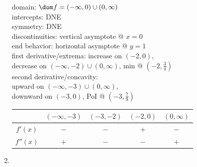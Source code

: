 \documentclass{book}
\begin{document}
\begin{appendices}
\begin{enumerate}[!HW!]
\begin{multicols}{2}
domain: $\dom f = (-\infty,0)\cup(0,\infty)$\\
intercepts: DNE\\
symmetry:  DNE \\ 
discontinuities: vertical asymptote @ $x=0$\\
end behavior: horizontal asymptote @ $y=1$\\ 
first derivative/extrema: increase on $(-2,0)$,\\ decrease on $(-\infty,-2)\cup (0,\infty)$, min @ $\left(-2,\frac{3}{4}\right)$ \\
second derivative/concavity:\\ upward on $(-\infty,-3)\cup(0,\infty)$,\\ downward on $(-3, 0)$, PoI @ $\left(-3,\frac{7}{9}\right)$ \vspace{-15pt}
\begin{center}
\begin{tabular}{c|c|c|c|c}
 & $(-\infty, -3)$ & $(-3, -2)$ & $(-2, 0)$ & $(0,\infty)$ \\ \hline
$f'(x)$ & $-$ & $-$ & $+$ & $-$ \\ 
$f''(x)$ & $+$ & $-$ & $-$ & $+$\\ 
\end{tabular}
\end{center} 
\end{multicols}

\item \mbox{}\vspace{-25pt}

\begin{multicols}{2}
\columnbreak
 

\end{multicols}
\end{enumerate}
\end{appendices}
\end{document}
